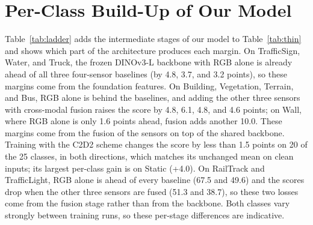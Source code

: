 \section{Per-Class Build-Up of Our Model}
\label{app:ladder}
Table~\ref{tab:ladder} adds the intermediate stages of our model to Table~\ref{tab:thin} and shows which part of the architecture produces each margin. On TrafficSign, Water, and Truck, the frozen DINOv3-L backbone with RGB alone is already ahead of all three four-sensor baselines (by 4.8, 3.7, and 3.2 points), so these margins come from the foundation features. On Building, Vegetation, Terrain, and Bus, RGB alone is behind the baselines, and adding the other three sensors with cross-modal fusion raises the score by 4.8, 6.1, 4.8, and 4.6 points; on Wall, where RGB alone is only 1.6 points ahead, fusion adds another 10.0. These margins come from the fusion of the sensors on top of the shared backbone. Training with the C2D2 scheme changes the score by less than 1.5 points on 20 of the 25 classes, in both directions, which matches its unchanged mean on clean inputs; its largest per-class gain is on Static (+4.0). On RailTrack and TrafficLight, RGB alone is ahead of every baseline (67.5 and 49.6) and the scores drop when the other three sensors are fused (51.3 and 38.7), so these two losses come from the fusion stage rather than from the backbone. Both classes vary strongly between training runs, so these per-stage differences are indicative.

\origFloatBarrier
